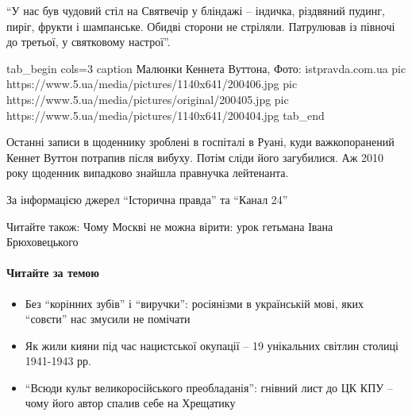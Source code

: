 \begin{itemize}
\enquote{У нас був чудовий стіл на Святвечір у бліндажі – індичка, різдвяний
пудинг, пиріг, фрукти і шампанське. Обидві сторони не стріляли. Патрулював
із півночі до третьої, у святковому настрої}.

\ifcmt
tab_begin cols=3
	caption Малюнки Кеннета Вуттона, Фото: istpravda.com.ua
	pic https://www.5.ua/media/pictures/1140x641/200406.jpg
	pic https://www.5.ua/media/pictures/original/200405.jpg
	pic https://www.5.ua/media/pictures/1140x641/200404.jpg
tab_end
\fi

Останні записи в щоденнику зроблені в госпіталі в Руані, куди
важкопоранений Кеннет Вуттон потрапив після вибуху. Потім сліди його
загубилися. Аж 2010 року щоденник випадково знайшла правнучка лейтенанта.

\end{itemize}

За інформацією джерел \enquote{Історична правда} та \enquote{Канал 24}

Читайте також: Чому Москві не можна вірити: урок гетьмана Івана
Брюховецького

\paragraph{Читайте за темою}

\begin{itemize}
	
\item Без \enquote{корінних зубів} і \enquote{виручки}: росіянізми в українській мові, яких \enquote{совєти}
нас змусили не помічати

\item Як жили кияни під час нацистської окупації – 19 унікальних світлин столиці
1941-1943 рр.

\item \enquote{Всюди культ великоросійського преобладанія}: гнівний лист до ЦК КПУ –
				чому його автор спалив себе на Хрещатику
\end{itemize}

